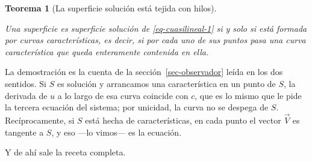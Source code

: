 \documentclass[
  spanish,
  a4paper,
]{scrbook}
\theoremstyle{definition}
\theoremstyle{plain}
\theoremstyle{definition}
\theoremstyle{plain}
\newtheorem{theorem}{Teorema}[chapter]
\theoremstyle{definition}
\theoremstyle{remark}
\begin{document}
\begin{theorem}[La superficie solución está tejida con
hilos]\protect\hypertarget{thm-tejido}{}\label{thm-tejido}

Una superficie es superficie solución de \ref{eq-cuasilineal-1} si y
solo si está formada por curvas características, es decir, si por cada
uno de sus puntos pasa una curva característica que queda enteramente
contenida en ella.

\end{theorem}

La demostración es la cuenta de la sección~\ref{sec-observador} leída en
los dos sentidos. Si \(S\) es solución y arrancamos una característica
en un punto de \(S\), la derivada de \(u\) a lo largo de esa curva
coincide con \(c\), que es lo mismo que le pide la tercera ecuación del
sistema; por unicidad, la curva no se despega de \(S\). Recíprocamente,
si \(S\) está hecha de características, en cada punto el vector
\(\vec V\) es tangente a \(S\), y eso ---lo vimos--- es la ecuación.

Y de ahí sale la receta completa.
\end{document}
